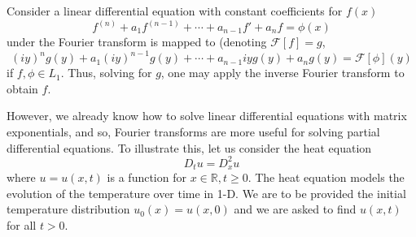 \documentclass[]{article}
\theoremstyle{definition}
\theoremstyle{definition}
\begin{document}
Consider a linear 
differential equation with constant coefficients for \(f(x)\) 
\[f^{(n)} + a_1 f^{(n - 1)} + \cdots + a_{n - 1}f' + a_n f = \phi(x)\]
under the Fourier transform is mapped to (denoting \(\mathcal{F}[f] = g\),
\[(iy)^ng(y) + a_1 (iy)^{n - 1}g(y) + \cdots + a_{n - 1} iy g(y) + a_n g(y) = \mathcal{F}[\phi](y)\]
if \(f, \phi \in L_1\). Thus, solving for \(g\), one may apply the inverse Fourier 
transform to obtain \(f\). 

However, we already know how to solve linear differential equations with matrix exponentials, 
and so, Fourier transforms are more useful for solving partial differential equations.
To illustrate this, let us consider the heat equation
\[D_t u = D_x^2 u\]
where \(u = u(x, t)\) is a function for \(x \in \mathbb{R}, t \ge 0\). The heat 
equation models the evolution of the temperature over time in 1-D. 
We are to be provided the initial temperature distribution \(u_0(x) = u(x, 0)\) 
and we are asked to find \(u(x, t)\) for all \(t > 0\). 
\end{document}
